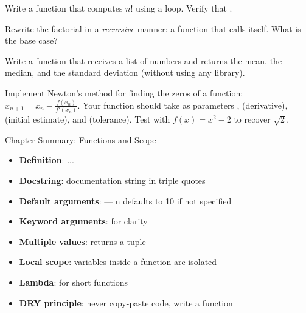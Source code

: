\begin{exercise}
Write a function  that computes $n!$ using a loop.
Verify that .
\end{exercise}

\begin{exercise}
Rewrite the factorial in a \emph{recursive} manner: a function that
calls itself. What is the base case?
\end{exercise}

\begin{exercise}
Write a function  that receives a list of numbers
and returns the mean, the median, and the standard deviation (without using any library).
\end{exercise}

\begin{exercise}
Implement Newton's method for finding the zeros
of a function: $x_{n+1} = x_n - \frac{f(x_n)}{f'(x_n)}$.
Your function should take as parameters ,  (derivative), 
(initial estimate), and  (tolerance). Test with
$f(x) = x^2 - 2$ to recover $\sqrt{2}$.
\end{exercise}

\begin{keyformulas}{Chapter Summary: Functions and Scope}
\begin{itemize}
    \item \textbf{Definition}:  ... 
    \item \textbf{Docstring}: documentation string in triple quotes
    \item \textbf{Default arguments}:  --- n defaults to 10 if not specified
    \item \textbf{Keyword arguments}:  for clarity
    \item \textbf{Multiple values}:  returns a tuple
    \item \textbf{Local scope}: variables inside a function are isolated
    \item \textbf{Lambda}:  for short functions
    \item \textbf{DRY principle}: never copy-paste code, write a function
\end{itemize}
\end{keyformulas}
